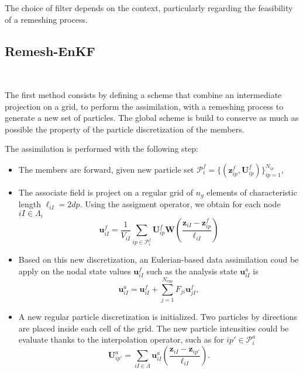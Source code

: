 The choice of filter depends on the context, particularly regarding the feasibility of a remeshing process.

\subsection{Remesh-EnKF}~\label{remesh_enkf}

The first method consists by defining a scheme that combine an intermediate projection on a grid, to perform the assimilation, with a remeshing process to generate a new set of particles. The global scheme is build to conserve as much as possible the property of the particle discretization of the members.

The assimilation is performed with the following step:
\begin{itemize}
    \item The members are forward, given new particle set $\mathcal{P}^f_i = \{(\bm z^f_{ip}, \bm U^f_{ip})\}_{ip = 1}^{N_{ip}}$,
    \item The associate field is project on a regular grid of $n_g$ elements of characteristic length $\ell_{iI}= 2dp$. Using the assigment operator, we obtain for each node $iI \in \Lambda_{i}$
          \begin{equation*}
              \bm{u}^f_{iI} = \frac1{V_{iI}} \sum_{ip \in \mathcal P^f_i} \bm U^f_{ip}  \bm W \left(\frac{\bm z_{iI} - \bm z^f_{ip}}{\ell_{iI}} \right)
          \end{equation*}
    \item Based on this new discretization, an Eulerian-based data assimilation coud be apply on the nodal state values $ \bm{u}^f_{iI}$ such as the analysis state $\bm{u}_{iI}^a$ is
          \begin{equation*}
              \bm{u}^a_{iI} = \bm{u}^f_{iI} + \sum_{j=1}^{N_{\text{ens}}} F_{ji} \bm{u}^f_{jI},
          \end{equation*}
    \item A new regular particle discretization is initialized. Two particles by directions are placed inside each cell of the grid. The new particle intensities could be evaluate thanks to the interpolation operator, such as for $ip' \in \mathcal P_i^a$
          \begin{equation*}
              \bm U_{ip'}^a = \sum_{iI \in \Lambda} \bm u^a_{iI} \left(\frac{\bm z_{iI} - \bm z_{ip'}}{\ell_{iI}} \right).
          \end{equation*}
\end{itemize}

